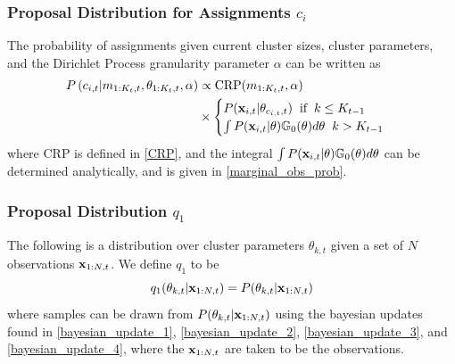 \documentclass[twocolumn, final]{svjour3}
\begin{document}
\subsubsection{Proposal Distribution for Assignments $c_{i}$}
\label{sec:smc_proposal_1}

The probability of assignments given current cluster sizes, cluster parameters, and the Dirichlet Process granularity parameter $\alpha$ can be written as
\begin{equation}
\label{smc_assig_eqn}
\begin{split}
P \left( c_{i,t} | m_{1:K_{t}, t}, \theta_{1:K_{t}, t}, \alpha \right) &\propto
\text{CRP}(m_{1:K_{t}, t}, \alpha) \\ &\times
\begin{cases}
P(\bold{x}_{i,t} | \theta_{c_{i,t},t}) \hspace{2mm} \text{if} \hspace{2mm} k \leq K_{t-1} \\
\int P(\bold{x}_{i,t} | \theta) \mathbb{G}_{0}(\theta)d\theta \hspace{2mm} k > K_{t-1}
\end{cases}
\end{split}
\end{equation}
where CRP is defined in \eqref{CRP}, and the integral $\int P(\bold{x}_{i,t} | \theta) \mathbb{G}_{0}(\theta)d\theta$ can be determined analytically, and is given in \eqref{marginal_obs_prob}.





\subsubsection{Proposal Distribution $q_{1}$}
\label{sec:smc_proposal_2}

The following is a distribution over cluster parameters $\theta_{k,t}$ given a set of $N$ observations $\bold{x}_{1:N, t}$. We define $q_{1}$ to be
\begin{equation}
\label{smc_q1_eqn}
q_{1}(\theta_{k,t} | \bold{x}_{1:N,t}) = P(\theta_{k,t} | \bold{x}_{1:N,t})
\end{equation}
where samples can be drawn from $P(\theta_{k,t} | \bold{x}_{1:N,t})$ using the bayesian updates found in \eqref{bayesian_update_1}, \eqref{bayesian_update_2}, \eqref{bayesian_update_3}, and \eqref{bayesian_update_4}, where the $\bold{x}_{1:N,t}$ are taken to be the observations.
\end{document}
